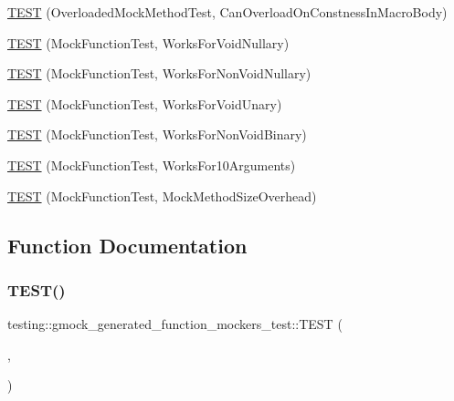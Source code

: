 \begin{DoxyCompactItemize}
\item 
\mbox{\hyperlink{namespacetesting_1_1gmock__generated__function__mockers__test_aa58ec93a77bee21244c10da2bc8cf70e}{T\+E\+ST}} (Overloaded\+Mock\+Method\+Test, Can\+Overload\+On\+Constness\+In\+Macro\+Body)
\item 
\mbox{\hyperlink{namespacetesting_1_1gmock__generated__function__mockers__test_a8d67aadbc04fee7e2afc10ee91a76b74}{T\+E\+ST}} (Mock\+Function\+Test, Works\+For\+Void\+Nullary)
\item 
\mbox{\hyperlink{namespacetesting_1_1gmock__generated__function__mockers__test_a90817999d7f25ecf280453efb157db84}{T\+E\+ST}} (Mock\+Function\+Test, Works\+For\+Non\+Void\+Nullary)
\item 
\mbox{\hyperlink{namespacetesting_1_1gmock__generated__function__mockers__test_ab0e1ede6a1f6ef1774e27f5793a33599}{T\+E\+ST}} (Mock\+Function\+Test, Works\+For\+Void\+Unary)
\item 
\mbox{\hyperlink{namespacetesting_1_1gmock__generated__function__mockers__test_ab6337da98bc6bc97100ab177386f3b2b}{T\+E\+ST}} (Mock\+Function\+Test, Works\+For\+Non\+Void\+Binary)
\item 
\mbox{\hyperlink{namespacetesting_1_1gmock__generated__function__mockers__test_aa92f0b2b98d76f2c881103a19bed7ba6}{T\+E\+ST}} (Mock\+Function\+Test, Works\+For10\+Arguments)
\item 
\mbox{\hyperlink{namespacetesting_1_1gmock__generated__function__mockers__test_af89476eb6775c51ca67e398d06c35d43}{T\+E\+ST}} (Mock\+Function\+Test, Mock\+Method\+Size\+Overhead)
\end{DoxyCompactItemize}


\subsection{Function Documentation}
\mbox{\label{namespacetesting_1_1gmock__generated__function__mockers__test_ae0d5aa8e715f3c183f1ccdcf390187e7}} 
\subsubsection{\texorpdfstring{TEST()}{TEST()}\hspace{0.1cm}{\footnotesize\ttfamily [1/11]}}
{\footnotesize\ttfamily testing\+::gmock\+\_\+generated\+\_\+function\+\_\+mockers\+\_\+test\+::\+T\+E\+ST (\begin{DoxyParamCaption}\item[{Expect\+Call\+Test}]{,  }\item[{Unmentioned\+Function\+Can\+Be\+Called\+Any\+Number\+Of\+Times}]{ }\end{DoxyParamCaption})}


